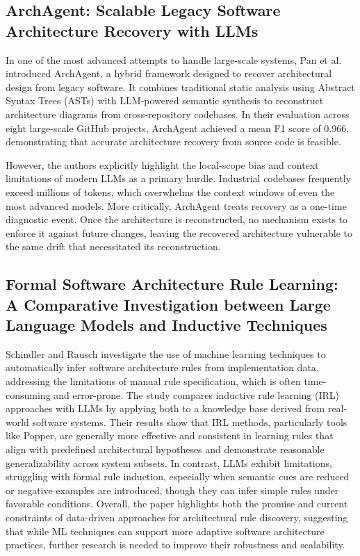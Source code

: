 \documentclass[sigconf,screen]{acmart}
\begin{document}
\subsection{ArchAgent: Scalable Legacy Software Architecture Recovery with LLMs}
In one of the most advanced attempts to handle large-scale systems, Pan et al.~\cite{pan2026} introduced ArchAgent, a hybrid framework designed to recover architectural design from legacy software. It combines traditional static analysis using Abstract Syntax Trees (ASTs) with LLM-powered semantic synthesis to reconstruct architecture diagrams from cross-repository codebases. In their evaluation across eight large-scale GitHub projects, ArchAgent achieved a mean F1 score of 0.966, demonstrating that accurate architecture recovery from source code is feasible.

However, the authors explicitly highlight the local-scope bias and context limitations of modern LLMs as a primary hurdle. Industrial codebases frequently exceed millions of tokens, which overwhelms the context windows of even the most advanced models. More critically, ArchAgent treats recovery as a one-time diagnostic event. Once the architecture is reconstructed, no mechanism exists to enforce it against future changes, leaving the recovered architecture vulnerable to the same drift that necessitated its reconstruction.

\subsection{Formal Software Architecture Rule Learning: A Comparative Investigation between Large Language Models and Inductive Techniques}
Schindler and Rausch \cite{schindler2024} investigate the use of machine learning techniques to automatically infer software architecture rules from implementation data, addressing the limitations of manual rule specification, which is often time-consuming and error-prone. The study compares inductive rule learning (IRL) approaches with LLMs by applying both to a knowledge base derived from real-world software systems. Their results show that IRL methods, particularly tools like Popper, are generally more effective and consistent in learning rules that align with predefined architectural hypotheses and demonstrate reasonable generalizability across system subsets. In contrast, LLMs exhibit limitations, struggling with formal rule induction, especially when semantic cues are reduced or negative examples are introduced, though they can infer simple rules under favorable conditions. Overall, the paper highlights both the promise and current constraints of data-driven approaches for architectural rule discovery, suggesting that while ML techniques can support more adaptive software architecture practices, further research is needed to improve their robustness and scalability.
\end{document}
